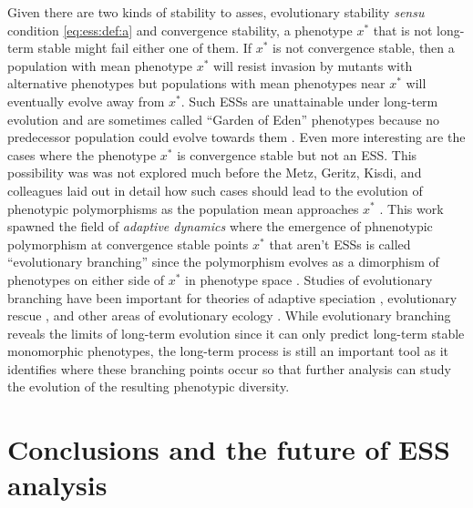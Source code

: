 \documentclass[11pt]{article}
\newcommand{\ess}[1]{#1^*}
\begin{document}
Given there are two kinds of stability to asses, evolutionary stability \textit{sensu} condition \eqref{eq:ess:def:a} and convergence stability, a phenotype $\ess{x}$ that is not long-term stable might fail either one of them. If $\ess{x}$ is not convergence stable, then a population with mean phenotype $\ess{x}$ will resist invasion by mutants with alternative phenotypes but populations with mean phenotypes near $\ess{x}$ will eventually evolve away from $\ess{x}$. Such ESSs are unattainable under long-term evolution and are sometimes called ``Garden of Eden'' phenotypes because no predecessor population could evolve towards them \cite{Hofbauer:Sigmund:1990}. Even more interesting are the cases where the phenotype $\ess{x}$ is convergence stable but not an ESS. This possibility was was not explored much before the Metz, Geritz, Kisdi, and colleagues laid out in detail how such cases should lead to the evolution of phenotypic polymorphisms as the population mean approaches $\ess{x}$ \cite{Metz:Geritz:1996,Geritz:Kisdi:1998}. This work spawned the field of \textit{adaptive dynamics} \cite{Dercole:Rinaldi:2008} where the emergence of phnenotypic polymorphism at convergence stable points $\ess{x}$ that aren't ESSs is called ``evolutionary branching'' since the polymorphism evolves as a dimorphism of phenotypes on either side of $\ess{x}$ in phenotype space \cite{Metz:Geritz:1996,Geritz:Kisdi:1998}. Studies of evolutionary branching have been important for theories of adaptive speciation \cite{Dieckmann:Doebeli:2004,Weissing:Edelaar:2011}, evolutionary rescue \cite{Ferriere:Legendre:2013}, and other areas of evolutionary ecology \cite{Dercole:Rinaldi:2008}. While evolutionary branching reveals the limits of long-term evolution since it can only predict long-term stable monomorphic phenotypes, the long-term process is still an important tool as it identifies where these branching points occur so that further analysis can study the evolution of the resulting phenotypic diversity.

\section{Conclusions and the future of ESS analysis}
\end{document}
